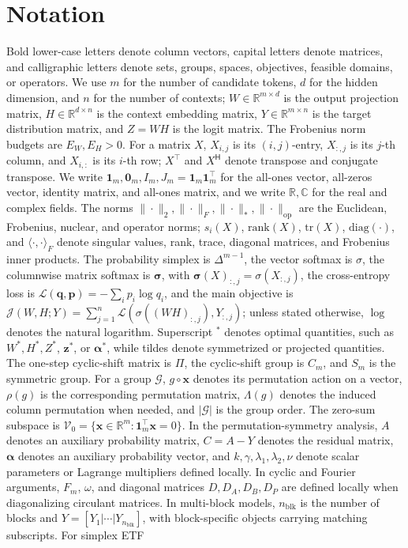 \documentclass[11pt]{article}
\begin{document}
\section{Notation}
Bold lower-case letters denote column vectors, capital letters denote matrices, and calligraphic letters denote sets, groups, spaces, objectives, feasible domains, or operators. We use \(m\) for the number of candidate tokens, \(d\) for the hidden dimension, and \(n\) for the number of contexts; \(W\in\mathbb{R}^{m\times d}\) is the output projection matrix, \(H\in\mathbb{R}^{d\times n}\) is the context embedding matrix, \(Y\in\mathbb{R}^{m\times n}\) is the target distribution matrix, and \(Z=WH\) is the logit matrix. The Frobenius norm budgets are \(E_W,E_H>0\). For a matrix \(X\), \(X_{i,j}\) is its \((i,j)\)-entry, \(X_{:,j}\) is its \(j\)-th column, and \(X_{i,:}\) is its \(i\)-th row; \(X^\top\) and \(X^{\mathsf H}\) denote transpose and conjugate transpose. We write \(\boldsymbol{1}_m,\boldsymbol{0}_m,I_m,J_m=\boldsymbol{1}_m\boldsymbol{1}_m^\top\) for the all-ones vector, all-zeros vector, identity matrix, and all-ones matrix, and we write \(\mathbb R,\mathbb C\) for the real and complex fields. The norms \(\|\cdot\|_2,\|\cdot\|_F,\|\cdot\|_*,\|\cdot\|_{\mathrm{op}}\) are the Euclidean, Frobenius, nuclear, and operator norms; \(s_i(X)\), \(\mathrm{rank}(X)\), \(\mathrm{tr}(X)\), \(\mathrm{diag}(\cdot)\), and \(\langle\cdot,\cdot\rangle_F\) denote singular values, rank, trace, diagonal matrices, and Frobenius inner products. The probability simplex is \(\Delta^{m-1}\), the vector softmax is \(\sigma\), the columnwise matrix softmax is \(\boldsymbol{\sigma}\), with \(\boldsymbol{\sigma}(X)_{:,j}=\sigma(X_{:,j})\), the cross-entropy loss is \(\mathcal L(\boldsymbol q,\boldsymbol p)=-\sum_i p_i\log q_i\), and the main objective is \(\mathcal J(W,H;Y)=\sum_{j=1}^n\mathcal L(\sigma((WH)_{:,j}),Y_{:,j})\); unless stated otherwise, \(\log\) denotes the natural logarithm. Superscript \(^*\) denotes optimal quantities, such as \(W^*,H^*,Z^*\), \(\boldsymbol z^*\), or \(\boldsymbol{\alpha}^*\), while tildes denote symmetrized or projected quantities. The one-step cyclic-shift matrix is \(\Pi\), the cyclic-shift group is \(C_m\), and \(S_m\) is the symmetric group. For a group \(\mathcal G\), \(g\circ\boldsymbol{x}\) denotes its permutation action on a vector, \(\rho(g)\) is the corresponding permutation matrix, \(\Lambda(g)\) denotes the induced column permutation when needed, and \(|\mathcal G|\) is the group order. The zero-sum subspace is \(\mathcal V_0=\{\boldsymbol{x}\in\mathbb R^m:\boldsymbol{1}_m^\top\boldsymbol{x}=0\}\). In the permutation-symmetry analysis, \(A\) denotes an auxiliary probability matrix, \(C=A-Y\) denotes the residual matrix, \(\boldsymbol{\alpha}\) denotes an auxiliary probability vector, and \(k,\gamma,\lambda_1,\lambda_2,\nu\) denote scalar parameters or Lagrange multipliers defined locally. In cyclic and Fourier arguments, \(F_m\), \(\omega\), and diagonal matrices \(D,D_A,D_B,D_P\) are defined locally when diagonalizing circulant matrices. In multi-block models, \(n_{\mathrm{blk}}\) is the number of blocks and \(Y=[Y_1|\cdots|Y_{n_{\mathrm{blk}}}]\), with block-specific objects carrying matching subscripts. For simplex ETF 
\end{document}
